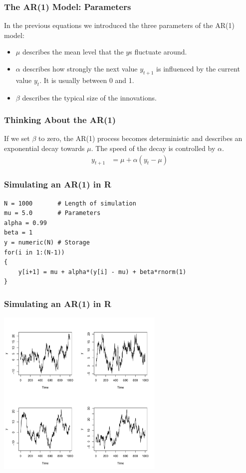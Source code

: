 \documentclass{beamer}
\begin{document}
\begin{frame}
\frametitle{The AR(1) Model: Parameters}
In the previous equations we introduced the
three parameters of the AR(1) model:\pause
\begin{itemize}
\item $\mu$ describes the mean level that the $y$s fluctuate around.\pause
\item $\alpha$ describes how strongly the next value $y_{t+1}$ is influenced
by the current value $y_t$. It is usually between 0 and 1.\pause
\item $\beta$ describes the typical size of the innovations.
\end{itemize}

\end{frame}


\begin{frame}
\frametitle{Thinking About the AR(1)}
If we set $\beta$ to zero, the AR(1) process becomes deterministic and
describes an exponential decay towards $\mu$. The speed of the decay is
controlled by $\alpha$.
\begin{align}
y_{t+1} &= \mu + \alpha(y_t - \mu)
\end{align}

\end{frame}


\begin{frame}[fragile]
\frametitle{Simulating an AR(1) in R}
\begin{verbatim}
N = 1000       # Length of simulation
mu = 5.0       # Parameters
alpha = 0.99
beta = 1
y = numeric(N) # Storage
for(i in 1:(N-1))
{
    y[i+1] = mu + alpha*(y[i] - mu) + beta*rnorm(1)
}
\end{verbatim}

\end{frame}

\begin{frame}[fragile]
\frametitle{Simulating an AR(1) in R}
\begin{center}
\includegraphics[width=0.6\textwidth]{images/ar1.pdf}
\end{center}

\end{frame}
\end{document}
